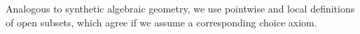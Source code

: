 Analogous to synthetic algebraic geometry,
we use pointwise and local definitions of open subsets,
which agree if we assume a corresponding choice axiom.
